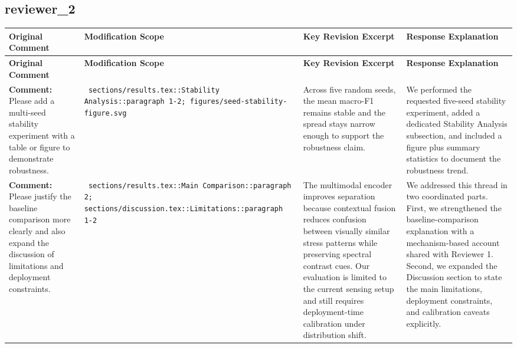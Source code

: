 \documentclass[11pt]{article}
\begin{document}
\subsection*{ reviewer\_2 }
\begin{longtable}{|p{}|p{}|p{}|p{}|}
\hline
\textbf{ Original Comment } & \textbf{ Modification Scope } & \textbf{ Key Revision Excerpt } & \textbf{ Response Explanation } \\
\hline
\endfirsthead
\hline
\textbf{ Original Comment } & \textbf{ Modification Scope } & \textbf{ Key Revision Excerpt } & \textbf{ Response Explanation } \\
\hline
\endhead
\textbf{ Comment: } Please add a multi-seed stability experiment with a table or figure to demonstrate robustness. & \texttt{ sections/results.tex::Stability Analysis::paragraph 1-2; figures/seed-stability-figure.svg } & {\color{blue}\ttfamily Across five random seeds, the mean macro-F1 remains stable and the spread stays narrow enough to support the robustness claim.} & We performed the requested five-seed stability experiment, added a dedicated Stability Analysis subsection, and included a figure plus summary statistics to document the robustness trend. \\
\hline
\textbf{ Comment: } Please justify the baseline comparison more clearly and also expand the discussion of limitations and deployment constraints. & \texttt{ sections/results.tex::Main Comparison::paragraph 2; sections/discussion.tex::Limitations::paragraph 1-2 } & {\color{blue}\ttfamily The multimodal encoder improves separation because contextual fusion reduces confusion between visually similar stress patterns while preserving spectral contrast cues. Our evaluation is limited to the current sensing setup and still requires deployment-time calibration under distribution shift.} & We addressed this thread in two coordinated parts. First, we strengthened the baseline-comparison explanation with a mechanism-based account shared with Reviewer 1. Second, we expanded the Discussion section to state the main limitations, deployment constraints, and calibration caveats explicitly. \\
\hline
\end{longtable}
\end{document}
